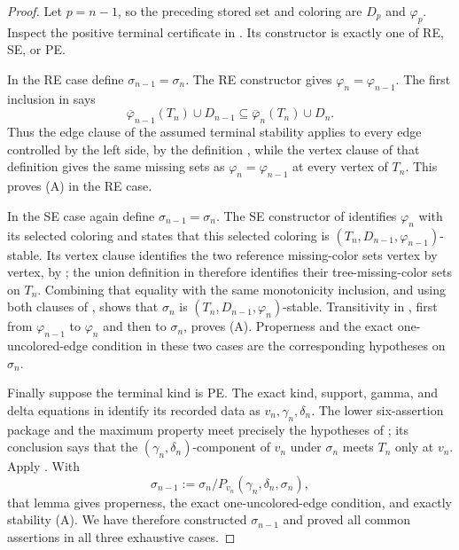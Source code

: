 \begin{proof}
Let \(p=n-1\), so the preceding stored set and coloring are
\(D_p\) and \(\varphi_p\).  Inspect the positive terminal certificate in
.  Its constructor is exactly one of RE, SE,
or PE.

In the RE case define \(\sigma_{n-1}=\sigma_n\).  The RE constructor gives
\(\varphi_n=\varphi_{n-1}\).  The first inclusion in
 says
\[
 \overline\varphi_{n-1}(T_n)\cup D_{n-1}
 \subseteq \overline\varphi_n(T_n)\cup D_n.
\]
Thus the edge clause of the assumed terminal stability applies to every
edge controlled by the left side, by the definition
, while the vertex clause of that definition gives
the same missing sets as \(\varphi_n=\varphi_{n-1}\) at every vertex of
\(T_n\).
This proves (A) in the RE case.

In the SE case again define \(\sigma_{n-1}=\sigma_n\).  The SE constructor
of  identifies \(\varphi_n\) with its selected
coloring and states that this selected coloring is
\((T_n,D_{n-1},\varphi_{n-1})\)-stable.  Its vertex clause identifies the
two reference missing-color sets vertex by vertex, by
; the union definition in
 therefore identifies their tree-missing-color
sets on \(T_n\).  Combining that equality with the same monotonicity
inclusion, and using both clauses of , shows that
\(\sigma_n\) is \((T_n,D_{n-1},\varphi_n)\)-stable.  Transitivity in
, first from \(\varphi_{n-1}\) to \(\varphi_n\) and then to
\(\sigma_n\), proves (A).  Properness and the exact one-uncolored-edge
condition in these two cases are the corresponding hypotheses on
\(\sigma_n\).

Finally suppose the terminal kind is PE.  The exact kind, support, gamma,
and delta equations in  identify its recorded
data as \(v_n,\gamma_n,\delta_n\).  The lower six-assertion package and the
maximum property meet precisely the hypotheses of ;
its conclusion says that the \((\gamma_n,\delta_n)\)-component of \(v_n\)
under \(\sigma_n\) meets \(T_n\) only at \(v_n\).  Apply
.  With
\[
 \sigma_{n-1}:=
 \sigma_n/P_{v_n}(\gamma_n,\delta_n,\sigma_n),
\]
that lemma gives properness, the exact one-uncolored-edge condition, and
exactly stability (A).  We have therefore constructed \(\sigma_{n-1}\)
and proved all common assertions in all three exhaustive cases.


\end{proof}

